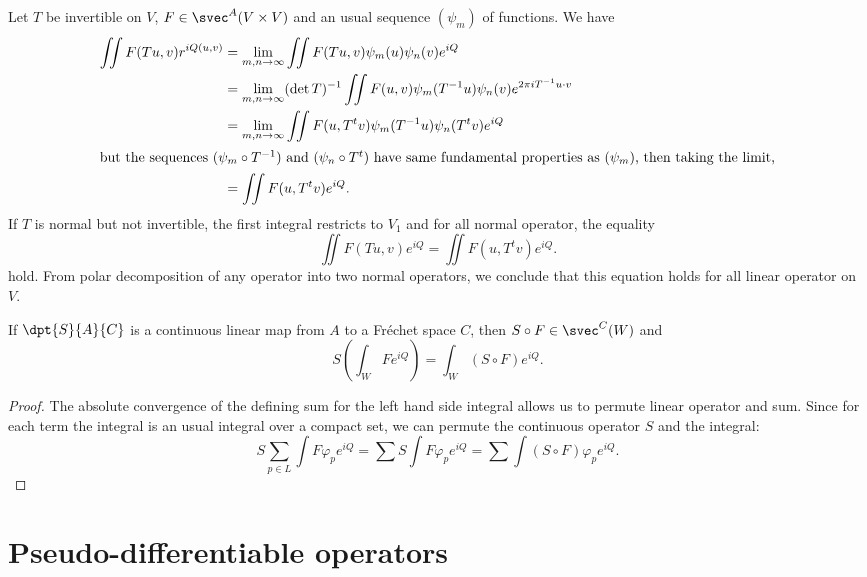 Let $T$ be invertible on $V$, $F\in\svec^A(V\times V)$ and an usual sequence $(\psi_m)$ of functions. We have
\begin{equation}
	\begin{split}
		\iint F(Tu,v)r^{iQ(u,v)}&=\lim_{m,n\to\infty}\iint F(Tu,v)\psi_m(u)\psi_n(v)e^{iQ}\\
		&=\lim_{m,n\to\infty}(\det T)^{-1}\iint F(u,v)\psi_m(T^{-1}u)\psi_n(v)e^{2\pi i T^{-1} u\cdot v}\\
		&=\lim_{m,n\to\infty}\iint F(u,T^tv)\psi_m(T^{-1}u)\psi_n(T^tv)e^{iQ}\\
		\intertext{but the sequences $(\psi_m\circ T^{-1})$ and $(\psi_n\circ T^t)$ have same fundamental properties as $(\psi_m)$, then taking the limit,}
		&=\iint F(u,T^tv)e^{iQ}.
	\end{split}
\end{equation}
If $T$ is normal but not invertible, the first integral restricts to $V_1$ and for all normal operator, the equality
\[
	\iint F(Tu,v)e^{iQ}=\iint F(u,T^tv)e^{iQ}.
\]
hold. From polar decomposition of any operator into two normal operators, we conclude that this equation holds for all linear operator on $V$.

\begin{proposition}
	If $\dpt{S}{A}{C}$ is a continuous linear map from $A$ to a Fréchet space $C$, then $S\circ F\in\svec^C(W)$ and
	\begin{equation}
		S( \int_WFe^{iQ} )=\int_W(S\circ F)e^{iQ}.
	\end{equation}

\end{proposition}

\begin{proof}
	The absolute convergence of the defining sum for the left hand side integral allows us to permute linear operator and sum. Since for each term the integral is an usual integral over a compact set, we can permute the continuous operator $S$ and the integral:
	\begin{equation}
		S\sum_{p\in L}\int F\varphi_pe^{iQ}=\sum S\int F\varphi_pe^{iQ}=\sum\int (S\circ F)\varphi_pe^{iQ}.
	\end{equation}


\end{proof}




%
\section{Pseudo-differentiable operators}
%


